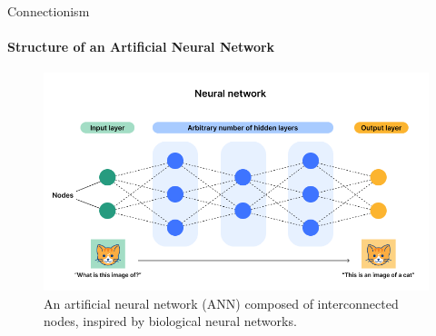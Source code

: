 \begin{frame}{Connectionism}
    \framesubtitle{Structure of an Artificial Neural Network}
    \begin{figure}
        \centering
        \includegraphics[width=\linewidth]{images/neural-network.png}
        \caption{An artificial neural network (ANN) composed of interconnected nodes, inspired by biological neural networks. }
    \end{figure}
\end{frame}

